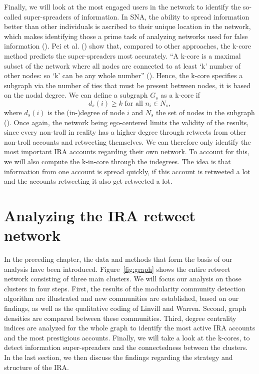 \documentclass[12pt, titlepage=true, toc=bib]{scrartcl}
\begin{document}
Finally, we will look at the most engaged users in the network to identify the so-called super-spreaders of information. In SNA, the ability to spread information better than other individuals is ascribed to their unique location in the network, which makes identifying those a prime task of analyzing networks used for false information (\cite[1]{pei_searching_2015}). Pei et al. (\cite*{pei_searching_2015}) show that, compared to other approaches, the k-core method predicts the super-spreaders most accurately. \enquote{A k-core is a maximal subset of the network where all nodes are connected to at least \enquote{k} number of other nodes: so \enquote{k} can be any whole number} (\cite[983]{golovchenko_state_2018}). Hence, the k-core specifies a subgraph via the number of ties that must be present between nodes, it is based on the nodal degree. We can define a subgraph \( G_{s} \) as a k-core if \[ d_{s}(i) \geq k \text{ for all } n_{i} \in N_{s} ,\] where \( d_{s}(i) \) is the (in-)degree of node \( i \) and \( N_{s} \) the set of nodes in the subgraph (\cite[266]{wasserman_social_1994}). Once again, the network being ego-centered limits the validity of the results, since every non-troll in reality has a higher degree through retweets from other non-troll accounts and retweeting themselves. We can therefore only identify the most important IRA accounts regarding their own network. To account for this, we will also compute the k-in-core through the indegrees. The idea is that information from one account is spread quickly, if this account is retweeted a lot and the accounts retweeting it also get retweeted a lot.

\section{Analyzing the IRA retweet network}

In the preceding chapter, the data and methods that form the basis of our analysis have been introduced. Figure~\ref{fig:graph} shows the entire retweet network consisting of three main clusters. We will focus our analysis on those clusters in four steps. First, the results of the modularity community detection algorithm are illustrated and new communities are established, based on our findings, as well as the qualitative coding of Linvill and Warren. Second, graph densities are compared between these communities. Third, degree centrality indices are analyzed for the whole graph to identify the most active IRA accounts and the most prestigious accounts. Finally, we will take a look at the k-cores, to detect information super-spreaders and the connectedness between the clusters. In the last section, we then discuss the findings regarding the strategy and structure of the IRA.
\end{document}
